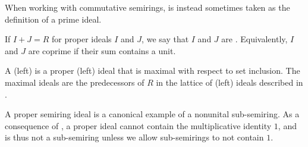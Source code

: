 \begin{definition}
\begin{thmenum}
    When working with commutative semirings,  is instead sometimes taken as the definition of a prime ideal.

     If \( I + J = R \) for proper ideals \( I \) and \( J \), we say that \( I \) and \( J \) are . Equivalently, \( I \) and \( J \) are coprime if their sum contains a unit.

     A (left)  is a proper (left) ideal that is maximal with respect to set inclusion. The maximal ideals are the predecessors of \( R \) in the lattice of (left) ideals described in .
  \end{thmenum}
\end{definition}

\begin{remark}\label{rem:semiring_ideal_as_sub_semiring}
  A proper semiring ideal is a canonical example of a nonunital sub-semiring. As a consequence of , a proper ideal cannot contain the multiplicative identity \( 1 \), and is thus not a sub-semiring unless we allow sub-semirings to not contain \( 1 \).
\end{remark}

